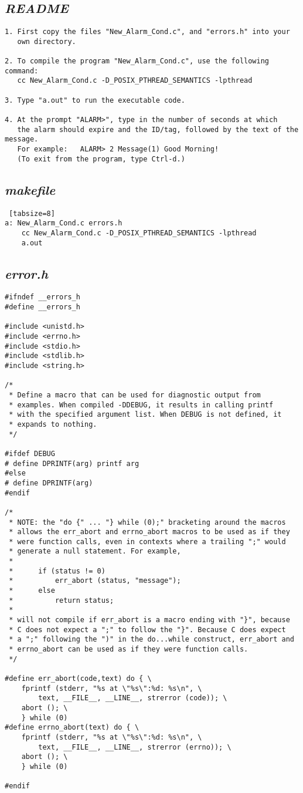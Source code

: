 \documentclass[11pt]{article}
\begin{document}
	\subsection{\emph{README}}
\begin{Verbatim}[tabsize=8]
1. First copy the files "New_Alarm_Cond.c", and "errors.h" into your
   own directory.

2. To compile the program "New_Alarm_Cond.c", use the following command:      
   cc New_Alarm_Cond.c -D_POSIX_PTHREAD_SEMANTICS -lpthread

3. Type "a.out" to run the executable code.

4. At the prompt "ALARM>", type in the number of seconds at which
   the alarm should expire and the ID/tag, followed by the text of the message.
   For example:   ALARM> 2 Message(1) Good Morning!  
   (To exit from the program, type Ctrl-d.)
\end{Verbatim}
	\subsection{\emph{makefile}}
	\lstset{language=C}        
\begin{Verbatim} [tabsize=8]
a: New_Alarm_Cond.c errors.h
	cc New_Alarm_Cond.c -D_POSIX_PTHREAD_SEMANTICS -lpthread
	a.out
	\end{Verbatim}
	\subsection{\emph{error.h}}
\lstset{language=C}        
\begin{lstlisting} 
#ifndef __errors_h
#define __errors_h

#include <unistd.h>
#include <errno.h>
#include <stdio.h>
#include <stdlib.h>
#include <string.h>

/*
 * Define a macro that can be used for diagnostic output from
 * examples. When compiled -DDEBUG, it results in calling printf
 * with the specified argument list. When DEBUG is not defined, it
 * expands to nothing.
 */
 
#ifdef DEBUG
# define DPRINTF(arg) printf arg
#else
# define DPRINTF(arg)
#endif

/*
 * NOTE: the "do {" ... "} while (0);" bracketing around the macros
 * allows the err_abort and errno_abort macros to be used as if they
 * were function calls, even in contexts where a trailing ";" would
 * generate a null statement. For example,
 *
 *      if (status != 0)
 *          err_abort (status, "message");
 *      else
 *          return status;
 *
 * will not compile if err_abort is a macro ending with "}", because
 * C does not expect a ";" to follow the "}". Because C does expect
 * a ";" following the ")" in the do...while construct, err_abort and
 * errno_abort can be used as if they were function calls.
 */
 
#define err_abort(code,text) do { \
    fprintf (stderr, "%s at \"%s\":%d: %s\n", \
        text, __FILE__, __LINE__, strerror (code)); \
    abort (); \
    } while (0)
#define errno_abort(text) do { \
    fprintf (stderr, "%s at \"%s\":%d: %s\n", \
        text, __FILE__, __LINE__, strerror (errno)); \
    abort (); \
    } while (0)

#endif
\end{lstlisting}	
\end{document}
